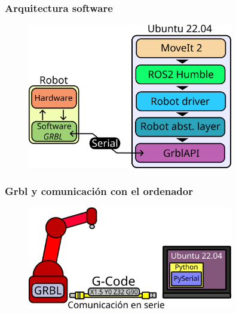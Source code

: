 \documentclass{beamer}
\begin{document}
\begin{frame}
  \frametitle{Arquitectura software}
  \begin{figure}[h]
    \centering
    \includegraphics[width=0.8\textwidth]{figs/arquitectura_sw.png}
  \end{figure}
  \end{frame}

\begin{frame}
\frametitle{Grbl y comunicación con el ordenador}
\begin{figure}[h]
  \centering
  \includegraphics[width=0.8\textwidth]{figs/coms.png}
\end{figure}
\end{frame}
\end{document}
